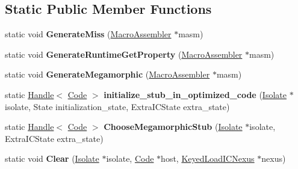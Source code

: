 \subsection*{Static Public Member Functions}
\begin{DoxyCompactItemize}
\item 
static void {\bfseries Generate\+Miss} (\hyperlink{classv8_1_1internal_1_1_macro_assembler}{Macro\+Assembler} $\ast$masm)\hypertarget{classv8_1_1internal_1_1_keyed_load_i_c_a9d1426ec0831318f33f95566c556a360}{}\label{classv8_1_1internal_1_1_keyed_load_i_c_a9d1426ec0831318f33f95566c556a360}

\item 
static void {\bfseries Generate\+Runtime\+Get\+Property} (\hyperlink{classv8_1_1internal_1_1_macro_assembler}{Macro\+Assembler} $\ast$masm)\hypertarget{classv8_1_1internal_1_1_keyed_load_i_c_ae86f7cdcc4ff0b505a11b2c4a1fa526b}{}\label{classv8_1_1internal_1_1_keyed_load_i_c_ae86f7cdcc4ff0b505a11b2c4a1fa526b}

\item 
static void {\bfseries Generate\+Megamorphic} (\hyperlink{classv8_1_1internal_1_1_macro_assembler}{Macro\+Assembler} $\ast$masm)\hypertarget{classv8_1_1internal_1_1_keyed_load_i_c_a1a831e5b3281590c7a6b00975c0baf5f}{}\label{classv8_1_1internal_1_1_keyed_load_i_c_a1a831e5b3281590c7a6b00975c0baf5f}

\item 
static \hyperlink{classv8_1_1internal_1_1_handle}{Handle}$<$ \hyperlink{classv8_1_1internal_1_1_code}{Code} $>$ {\bfseries initialize\+\_\+stub\+\_\+in\+\_\+optimized\+\_\+code} (\hyperlink{classv8_1_1internal_1_1_isolate}{Isolate} $\ast$isolate, State initialization\+\_\+state, Extra\+I\+C\+State extra\+\_\+state)\hypertarget{classv8_1_1internal_1_1_keyed_load_i_c_a6dc6d167fdf2391ab6b7e01037deabd8}{}\label{classv8_1_1internal_1_1_keyed_load_i_c_a6dc6d167fdf2391ab6b7e01037deabd8}

\item 
static \hyperlink{classv8_1_1internal_1_1_handle}{Handle}$<$ \hyperlink{classv8_1_1internal_1_1_code}{Code} $>$ {\bfseries Choose\+Megamorphic\+Stub} (\hyperlink{classv8_1_1internal_1_1_isolate}{Isolate} $\ast$isolate, Extra\+I\+C\+State extra\+\_\+state)\hypertarget{classv8_1_1internal_1_1_keyed_load_i_c_a6b73e1973668604f42e0168096c06db6}{}\label{classv8_1_1internal_1_1_keyed_load_i_c_a6b73e1973668604f42e0168096c06db6}

\item 
static void {\bfseries Clear} (\hyperlink{classv8_1_1internal_1_1_isolate}{Isolate} $\ast$isolate, \hyperlink{classv8_1_1internal_1_1_code}{Code} $\ast$host, \hyperlink{classv8_1_1internal_1_1_keyed_load_i_c_nexus}{Keyed\+Load\+I\+C\+Nexus} $\ast$nexus)\hypertarget{classv8_1_1internal_1_1_keyed_load_i_c_a2c40dece47acf9cd9b4f95f838fe3833}{}\label{classv8_1_1internal_1_1_keyed_load_i_c_a2c40dece47acf9cd9b4f95f838fe3833}

\end{DoxyCompactItemize}
